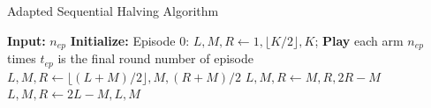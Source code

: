 \documentclass[
	landscape, %
]{ImperialPoster}
\begin{document}
\begin{multicols}{4}
	\begin{algorithm}[H]
		\caption{Adapted Sequential Halving Algorithm}\label{alg:SHA}
	    \begin{algorithmic}
		\State \textbf{Input:} $n_{ep}$ 
		\State \textbf{Initialize:} Episode 0: $L, M, R \gets1,\lfloor K/2 \rfloor,  K$;
		\State \textbf{Play} each arm $n_{ep}$ times
		\State $t_{ep}$ is the final round number of episode
			\State $L, M, R \gets \lfloor (L + M)/2\rfloor, M, (R + M)/2$
		\EndIf
			\State $L, M, R \gets M, R, 2R - M$
		\EndIf
			\State $L, M, R \gets 2 L - M, L, M$
		\EndIf {}
		\EndFor
	     \end{algorithmic}
		\end{algorithm}


\end{multicols}
\end{document}
